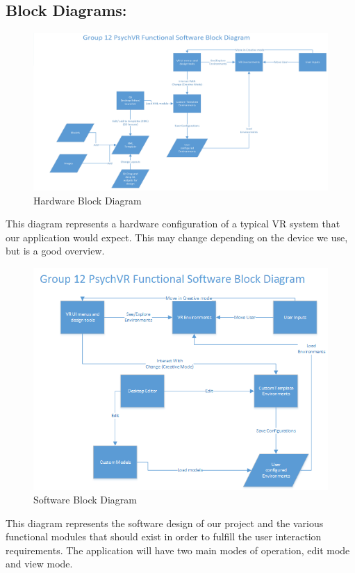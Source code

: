 \documentclass[a4paper,10pt]{article}
\begin{document}
	\subsection{Block Diagrams:}
	\begin{figure}[H]
	\includegraphics[width=\linewidth,height=\paperheight,keepaspectratio]{HardwareConfig.png}
	\caption{Hardware Block Diagram}
	\label{fig:hblock}
	\end{figure}
	This diagram represents a hardware configuration of a typical VR system that our application would expect. This may change depending on the device we use, but is a good overview.
	\pagebreak
	\begin{figure}[H]
	\includegraphics[width=\linewidth,height=\paperheight,keepaspectratio]{SoftwareConfig.png}
	\caption{Software Block Diagram}
	\label{fig:sblock}
	\end{figure}
	This diagram represents the software design of our project and the various functional modules that should exist in order to fulfill the user interaction requirements. 
	The application will have two main modes of operation, edit mode and view mode. 
\end{document}
